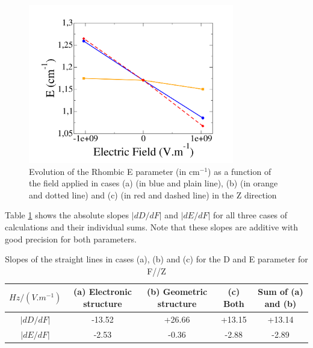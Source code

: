 \documentclass[10pt]{report}
\numberwithin{equation}{section}
\begin{document}
\begin{figure}[!ht]
    \centering
    \includegraphics[width=0.8\textwidth]{Images/E_E_Z.png}
    \caption{Evolution of the Rhombic E parameter (in cm$^{-1}$) as a function of the field applied in cases (a) (in blue and plain line), (b) (in orange and dotted line) and (c) (in red and dashed line) in the Z direction}
    \label{fig:Ni_E_Z}
\end{figure}


Table \ref{tab:Slope_D_Z} shows the absolute slopes $|dD/dF|$ and $|dE/dF|$ for all three cases of calculations and their individual sums.
Note that these slopes are additive with good precision for both parameters.

\begin{table}[!ht]
    \begin{tabular}{c | c c c c}
        \hline
        $Hz/(V.m^{-1})$ &  (a) Electronic structure & (b) Geometric structure & (c) Both & Sum of (a) and (b)\\
        \hline
        $|dD/dF|$ & -13.52	& +26.66& 	+13.15 & 	+13.14\\
        $|dE/dF|$ &-2.53& 	-0.36& 	-2.88& 	-2.89\\
    \end{tabular}
    \caption{Slopes of the straight lines in cases (a), (b) and (c) for the D and E parameter for F//Z}
    \label{tab:Slope_D_Z}
\end{table}
\end{document}
